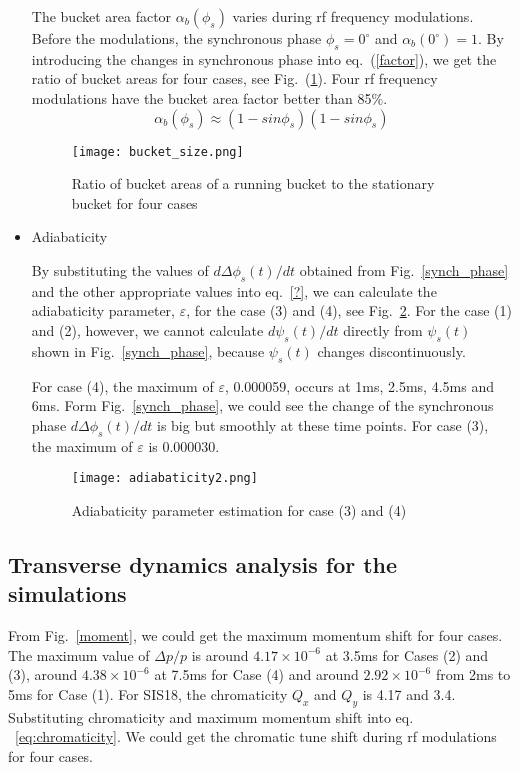 \begin{itemize}
The bucket area factor $\alpha_b (\phi_s) $ varies during rf frequency modulations. Before the modulations, the synchronous phase $\phi_s=0^\circ$ and  $\alpha_b(0^\circ) = 1$. By introducing the changes in synchronous phase into eq.~(\ref{factor}), we get the ratio of bucket areas for four cases, see Fig.~(\ref{bucket_size}). Four rf frequency modulations have the bucket area factor better than 85$\%$.
\begin{equation}
\alpha_b (\phi_s) \approx (1-sin \phi_s)(1-sin \phi_s)\label{factor}
\end{equation}
\begin{figure}[!htb]
   \centering   
   \texttt{[image: bucket\_size.png]}
   \caption{Ratio of bucket areas of a running bucket to the stationary bucket for four cases}
   \label{bucket_size}
\end{figure}
\item Adiabaticity

By substituting the values of $d\Delta \phi_s(t)/dt$ obtained from Fig.~\ref{synch_phase} and the other appropriate values into eq.~\ref{?}, we can calculate the adiabaticity parameter, $\varepsilon$, for the case (3) and (4), see Fig.~\ref{adiabaticity2}. For the case (1) and (2), however, we cannot calculate $d\psi_s( t )/dt$  directly from $\psi_s(t)$  shown in Fig.~\ref{synch_phase}, because $\psi_s(t)$ changes discontinuously. 

For case (4), the maximum of $\varepsilon$, 0.000059, occurs at 1ms, 2.5ms, 4.5ms and 6ms. Form Fig.~\ref{synch_phase}, we could see the change of the synchronous phase $d\Delta \phi_s(t)/dt$  is big but smoothly at these time points. For case (3), the maximum of $\varepsilon$ is 0.000030.

\begin{figure}[!htb]
   \centering   
   \texttt{[image: adiabaticity2.png]}
   \caption{Adiabaticity parameter estimation for case (3) and (4)}
   \label{adiabaticity2}
\end{figure}
\end{itemize}
\subsection{Transverse dynamics analysis for the simulations}
From Fig.~\ref{moment}, we could get the maximum momentum shift for four cases. The maximum value of $\Delta p/p$ is around $4.17 \times 10^{-6}$ at 3.5ms for Cases (2) and (3), around $4.38 \times 10^{-6}$ at 7.5ms for Case (4) and around $2.92 \times 10^{-6}$ from 2ms to 5ms for Case (1). For SIS18, the chromaticity $Q_x$ and $Q_y$ is 4.17 and 3.4. Substituting chromaticity and maximum momentum shift into eq. ~\ref{eq:chromaticity}. We could get the chromatic tune shift during rf modulations for four cases. 

